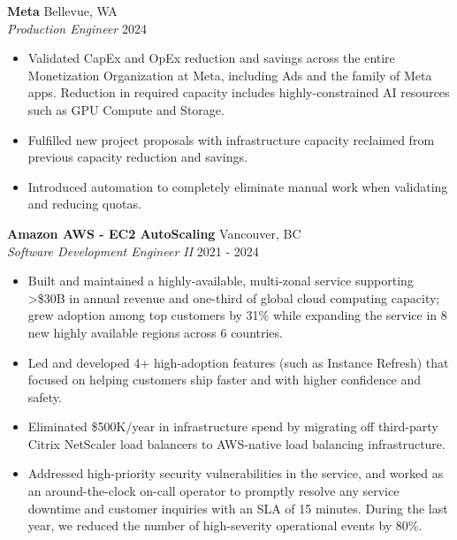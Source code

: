 \documentclass[a4paper]{article}
\begin{document}
\textbf{Meta} \hfill Bellevue, WA\\
\textit{Production Engineer} \hfill 2024\\
\vspace{-1mm}
\begin{itemize} \itemsep 1pt
    \item Validated CapEx and OpEx reduction and savings across the entire Monetization Organization at Meta, including Ads and the family of Meta apps. Reduction in required capacity includes highly-constrained AI resources such as GPU Compute and Storage.
    \item Fulfilled new project proposals with infrastructure capacity reclaimed from previous capacity reduction and savings.
    \item Introduced automation to completely eliminate manual work when validating and reducing quotas.
\end{itemize}

\textbf{Amazon AWS - EC2 AutoScaling} \hfill Vancouver, BC\\
\textit{Software Development Engineer II} \hfill 2021 - 2024\\
\vspace{-1mm}
\begin{itemize} \itemsep 1pt
    \item Built and maintained a highly-available, multi-zonal service supporting >\$30B in annual revenue and one-third of global cloud computing capacity; grew adoption among top customers by 31\% while expanding the service in 8 new highly available regions across 6 countries.
    \item Led and developed 4+ high-adoption features (such as Instance Refresh) that focused on helping customers ship faster and with higher confidence and safety.
    \item Eliminated \$500K/year in infrastructure spend by migrating off third-party Citrix NetScaler load balancers to AWS-native load balancing infrastructure.
    \item Addressed high-priority security vulnerabilities in the service, and worked as an around-the-clock on-call operator to promptly resolve any service downtime and customer inquiries with an SLA of 15 minutes. During the last year, we reduced the number of high-severity operational events by 80\%.
\end{itemize}
\end{document}
